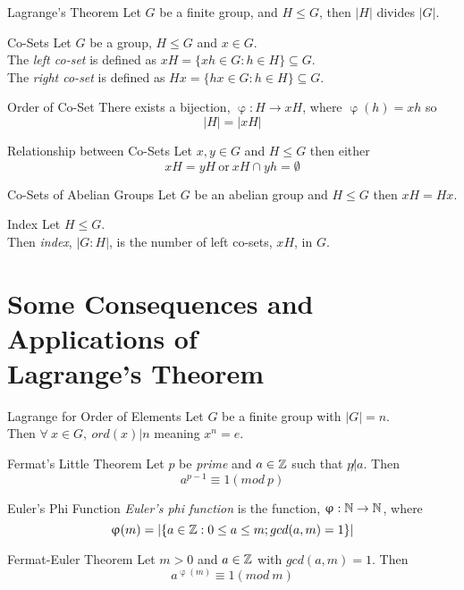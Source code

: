 \documentclass[11pt,a4paper]{article}
\begin{document}
\subtitle{Theorem 11.01 - }{Lagrange's Theorem}
Let $G$ be a finite group, and $H \leq G$, then $|H|$ divides $|G|$.\\

\subtitle{Definition 11.02 - }{Co-Sets}
Let $G$ be a group, $H \leq G$ and $x \in G$.\\
The \textit{left co-set} is defined as $xH = \{xh \in G : h \in H\} \subseteq G$.\\
The \textit{right co-set} is defined as $Hx = \{hx \in G : h \in H\} \subseteq G$.\\

\subtitle{Theorem 11.03 - }{Order of Co-Set}
There exists a bijection, $\upvarphi : H \to xH$, where $\upvarphi(h) = xh$ so $$|H| = |xH|$$

\subtitle{Theorem 11.04 - }{Relationship between Co-Sets}
Let $x, y \in G$ and $H \leq G$ then either
$$xH = yH \mathrm{\ or\ } xH \cap yh = \emptyset$$

\subtitle{Theorem 11.05 - }{Co-Sets of Abelian Groups}
Let $G$ be an abelian group and $H \leq G$ then $xH = Hx$.\\

\subtitle{Definition 11.06 - }{Index}
Let $H \leq G$.\\
Then \textit{index}, $|G : H|$, is the number of left co-sets, $xH$, in $G$.

\section{Some Consequences and Applications of\\ Lagrange's Theorem}

\subtitle{Propostion 12.01 - }{Lagrange for Order of Elements}
Let $G$ be a finite group with $|G| = n$.\\
Then $\forall\ x \in G,\ ord(x) | n$ meaning $x^n = e$.\\

\subtitle{Theorem 12.02 - }{Fermat's Little Theorem}
Let $p$ be \textit{prime} and $a \in \mathbb{Z}$ such that $p \not | a$. Then
$$a^{p-1} \equiv 1 (mod\ p)$$

\subtitle{Definition 12.03 - }{Euler's Phi Function}
\textit{Euler's phi function} is the function, $\upvarphi : \mathbb{N} \to \mathbb{N}$, where
$$\upvarphi(m) = |\{ a \in \mathbb{Z} : 0 \leq a \leq m; gcd(a, m) = 1 \}|$$

\subtitle{Theorem 12.04 - }{Fermat-Euler Theorem}
Let $m > 0$ and $a \in \mathbb{Z}$ with $gcd(a, m) = 1$. Then
$$a^{\upvarphi(m)} \equiv 1 (mod\ m)$$
\end{document}

